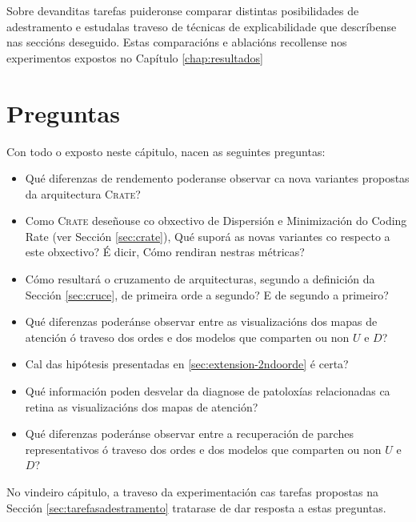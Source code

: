 Sobre devanditas tarefas puideronse comparar distintas posibilidades de adestramento e estudalas traveso de técnicas de \gls{explicabilidade} que descríbense nas seccións deseguido. Estas comparacións e ablacións recollense nos experimentos expostos no Capítulo \ref{chap:resultados}

\section{Preguntas}
\label{sec:hipotesis}

Con todo o exposto neste cápitulo, nacen as seguintes preguntas:

\begin{itemize}
				\item Qué diferenzas de rendemento poderanse observar ca nova variantes propostas da arquitectura \textsc{Crate}?
				\item Como \textsc{Crate} deseñouse co obxectivo de Dispersión e Minimización do Coding Rate (ver Sección \ref{sec:crate}), Qué suporá as novas variantes co respecto a este obxectivo? É dicir, Cómo rendiran nestras métricas?
				\item Cómo resultará o cruzamento de arquitecturas, segundo a definición da Sección \ref{sec:cruce}, de primeira orde a segundo? E de segundo a primeiro?
				\item Qué diferenzas poderánse observar entre as visualizacións dos mapas de atención ó traveso dos ordes e dos modelos que comparten ou non $U$ e $D$?
				\item Cal das hipótesis presentadas en \ref{sec:extension-2ndoorde} é certa?
				\item Qué información poden desvelar da diagnose de patoloxías relacionadas ca retina as visualizacións dos mapas de atención?
				\item Qué diferenzas poderánse observar entre a recuperación de parches representativos ó traveso dos ordes e dos modelos que comparten ou non $U$ e $D$?
\end{itemize}

No vindeiro cápitulo, a traveso da experimentación cas tarefas propostas na Sección \ref{sec:tarefasadestramento} tratarase de dar resposta a estas preguntas.
